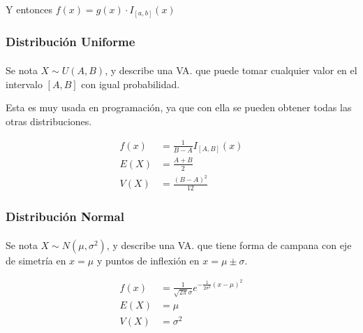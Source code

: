 \documentclass[../main.tex]{subfiles}
\begin{document}
Y entonces \(f(x) = g(x) \cdot I_{[a, b]}(x)\)

\subsubsection{Distribución Uniforme}

\paragraph{} Se nota \(X \sim U(A, B)\), y describe una VA. que puede tomar cualquier valor en el intervalo \([A, B]\) con igual probabilidad.

Esta es muy usada en programación, ya que con ella se pueden obtener todas las otras distribuciones.

\begin{align*}
  f(x) &= \frac{1}{B-A}I_{[A, B]}(x) \\
  E(X) &= \frac{A+B}{2} \\
  V(X) &= \frac{(B - A)^{2}}{12}
\end{align*}

\subsubsection{Distribución Normal}

\paragraph{} Se nota \(X \sim N(\mu, \sigma^{2})\), y describe una VA. que tiene forma de campana con eje de simetría en \(x = \mu\) y puntos de inflexión en \(x = \mu \pm \sigma\).

\begin{align*}
  f(x) &= \frac{1}{\sqrt{2\pi}\sigma}e^{-\frac{1}{2\sigma^{2}}(x - \mu)^{2}} \\
  E(X) &= \mu \\
  V(X) &= \sigma^{2}
\end{align*}
\end{document}
